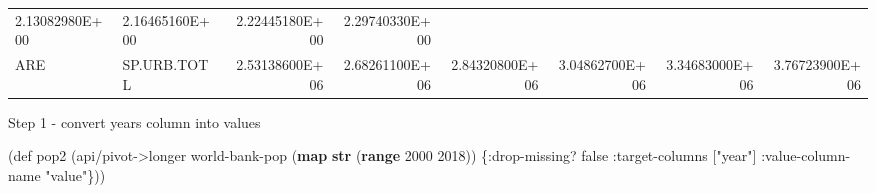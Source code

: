 \documentclass[]{article}
\newenvironment{Shaded}{\begin{snugshade}}{\end{snugshade}}
\newcommand{\KeywordTok}[1]{\textcolor[rgb]{0.13,0.29,0.53}{\textbf{#1}}}
\newcommand{\DecValTok}[1]{\textcolor[rgb]{0.00,0.00,0.81}{#1}}
\newcommand{\StringTok}[1]{\textcolor[rgb]{0.31,0.60,0.02}{#1}}
\newcommand{\FunctionTok}[1]{\textcolor[rgb]{0.00,0.00,0.00}{#1}}
\newcommand{\VariableTok}[1]{\textcolor[rgb]{0.00,0.00,0.00}{#1}}
\newcommand{\BuiltInTok}[1]{#1}
\newcommand{\AttributeTok}[1]{\textcolor[rgb]{0.77,0.63,0.00}{#1}}
\newcommand{\NormalTok}[1]{#1}
\begin{document}
\begin{longtable}[]{@{}llrrrrrr@{}}
\begin{minipage}[t]{0.11\columnwidth}
2.13082980E+00\strut
\end{minipage} & \begin{minipage}[t]{0.11\columnwidth}\raggedleft\strut
2.16465160E+00\strut
\end{minipage} & \begin{minipage}[t]{0.11\columnwidth}\raggedleft\strut
2.22445180E+00\strut
\end{minipage} & \begin{minipage}[t]{0.11\columnwidth}\raggedleft\strut
2.29740330E+00\strut
\end{minipage}\tabularnewline
\begin{minipage}[t]{0.06\columnwidth}\raggedright\strut
ARE\strut
\end{minipage} & \begin{minipage}[t]{0.08\columnwidth}\raggedright\strut
SP.URB.TOTL\strut
\end{minipage} & \begin{minipage}[t]{0.11\columnwidth}\raggedleft\strut
2.53138600E+06\strut
\end{minipage} & \begin{minipage}[t]{0.11\columnwidth}\raggedleft\strut
2.68261100E+06\strut
\end{minipage} & \begin{minipage}[t]{0.11\columnwidth}\raggedleft\strut
2.84320800E+06\strut
\end{minipage} & \begin{minipage}[t]{0.11\columnwidth}\raggedleft\strut
3.04862700E+06\strut
\end{minipage} & \begin{minipage}[t]{0.11\columnwidth}\raggedleft\strut
3.34683000E+06\strut
\end{minipage} & \begin{minipage}[t]{0.11\columnwidth}\raggedleft\strut
3.76723900E+06\strut
\end{minipage}\tabularnewline
\bottomrule
\end{longtable}

Step 1 - convert years column into values

\begin{Shaded}
\begin{Highlighting}[]
\NormalTok{(}\BuiltInTok{def}\FunctionTok{ pop2 }\NormalTok{(api/pivot->longer world-bank-pop (}\KeywordTok{map} \KeywordTok{str}\NormalTok{ (}\KeywordTok{range} \DecValTok{2000} \DecValTok{2018}\NormalTok{)) \{}\AttributeTok{:drop-missing}\NormalTok{? }\VariableTok{false}
                                                                         \AttributeTok{:target-columns}\NormalTok{ [}\StringTok{"year"}\NormalTok{]}
                                                                         \AttributeTok{:value-column-name} \StringTok{"value"}\NormalTok{\}))}
\end{Highlighting}
\end{Shaded}
\end{document}
